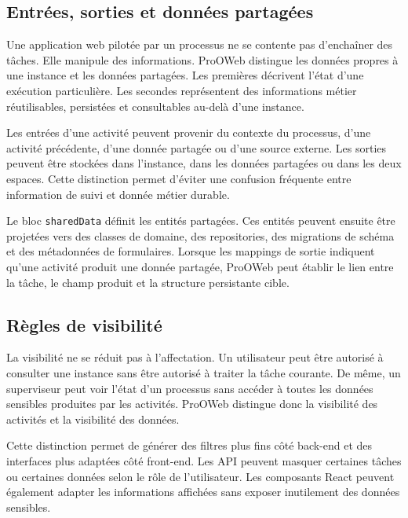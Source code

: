 \subsection{Entrées, sorties et données partagées}

Une application web pilotée par un processus ne se contente pas d'enchaîner des tâches. Elle manipule des informations. ProOWeb distingue les données propres à une instance et les données partagées. Les premières décrivent l'état d'une exécution particulière. Les secondes représentent des informations métier réutilisables, persistées et consultables au-delà d'une instance.

Les entrées d'une activité peuvent provenir du contexte du processus, d'une activité précédente, d'une donnée partagée ou d'une source externe. Les sorties peuvent être stockées dans l'instance, dans les données partagées ou dans les deux espaces. Cette distinction permet d'éviter une confusion fréquente entre information de suivi et donnée métier durable.

Le bloc \texttt{sharedData} définit les entités partagées. Ces entités peuvent ensuite être projetées vers des classes de domaine, des repositories, des migrations de schéma et des métadonnées de formulaires. Lorsque les mappings de sortie indiquent qu'une activité produit une donnée partagée, ProOWeb peut établir le lien entre la tâche, le champ produit et la structure persistante cible.

\subsection{Règles de visibilité}

La visibilité ne se réduit pas à l'affectation. Un utilisateur peut être autorisé à consulter une instance sans être autorisé à traiter la tâche courante. De même, un superviseur peut voir l'état d'un processus sans accéder à toutes les données sensibles produites par les activités. ProOWeb distingue donc la visibilité des activités et la visibilité des données.

Cette distinction permet de générer des filtres plus fins côté back-end et des interfaces plus adaptées côté front-end. Les API peuvent masquer certaines tâches ou certaines données selon le rôle de l'utilisateur. Les composants React peuvent également adapter les informations affichées sans exposer inutilement des données sensibles.

